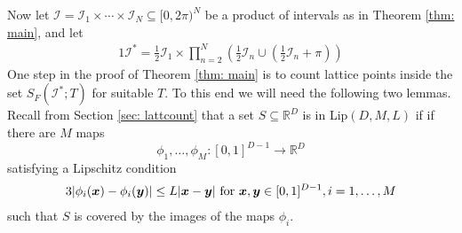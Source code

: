 \documentclass[11pt]{amsart}
\numberwithin{equation}{eqncounter}
\def\IR{\mathbb R}
\def\I{\mathcal{I}}
\renewcommand{\vec}[1]{\mbox{\boldmath$#1$}}
\def\vx{{\vec{x}}}
\def\vy{{\vec{y}}}
\begin{document}
Now let $\I=\I_1\times \cdots \times \I_N\subseteq [0,2\pi)^N$ be a product of intervals as in Theorem \ref{thm: main}, and let
\begin{alignat}1\label{def: Istar}
\I^*=\frac{1}{2}\I_1\times \prod_{n=2}^N \left(\frac{1}{2}\I_n\cup \left(\frac{1}{2}\I_n+\pi\right)\right)
\end{alignat}
One step in the proof of Theorem \ref{thm: main} is to count lattice points inside the set $S_F(\I^*;T)$ for suitable $T$. To this end we will need the following two lemmas.
Recall from Section \ref{sec: lattcount}
that a set $S\subseteq \IR^D$ is in Lip$(D,M,L)$ if  
if there are $M$ maps 
$$\phi_1,\ldots,\phi_M:[0,1]^{D-1}\longrightarrow \IR^D$$
satisfying a Lipschitz condition
\begin{alignat*}3
|\phi_i(\vx)-\phi_i(\vy)|\leq L|\vx-\vy| \text{ for } \vx,\vy \in [0,1]^{D-1}, i=1,\ldots,M 
\end{alignat*}
such that $S$ is covered by the images
of the maps $\phi_i$. 
\end{document}
